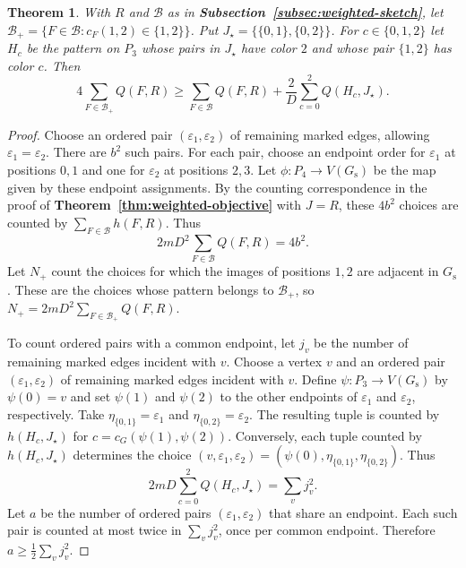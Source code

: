\documentclass[preprint,11pt,numbers]{elsarticle-arxiv}
\numberwithin{equation}{section}
\newtheorem{theorem}{Theorem}[section]
\theoremstyle{definition}
\begin{document}
\begin{theorem}\label{thm:remaining-edge-orderings}
With $R$ and $\mathcal B$ as in
\textbf{Subsection~\ref{subsec:weighted-sketch}}, let
$\mathcal B_+=\{F\in\mathcal B:c_F(1,2)\in\{1,2\}\}$.
Put $J_\star=\{\{0,1\},\{0,2\}\}$. For $c\in\{0,1,2\}$ let
$H_c$ be the pattern on $P_3$ whose pairs in $J_\star$ have
color $2$ and whose pair $\{1,2\}$ has color $c$. Then
\begin{equation}\label{eq:remaining-edge-orderings}
 4\sum_{F\in\mathcal B_+}Q(F,R)
 \geq\sum_{F\in\mathcal B}Q(F,R)
     +\frac{2}{D}\sum_{c=0}^2 Q(H_c,J_\star).
\end{equation}
\end{theorem}

\begin{proof}
Choose an ordered pair $(\varepsilon_1,\varepsilon_2)$ of
remaining marked edges, allowing $\varepsilon_1=\varepsilon_2$.
There are $b^2$ such pairs. For each pair, choose an endpoint
order for $\varepsilon_1$ at positions $0,1$ and one for
$\varepsilon_2$ at positions $2,3$. Let $\phi\colon P_4\to
V(G_{\mathrm s})$ be the map given by these endpoint assignments.
By the counting correspondence
in the proof of \textbf{Theorem~\ref{thm:weighted-objective}}
with $J=R$, these $4b^2$ choices are counted by
$\sum_{F\in\mathcal B}h(F,R)$. Thus
\[
 2mD^2\sum_{F\in\mathcal B}Q(F,R)=4b^2.
\]
Let $N_+$ count the choices for which the images of positions $1,2$
are adjacent in $G_{\mathrm s}$. These are the choices whose pattern
belongs to $\mathcal B_+$, so
$N_+=2mD^2\sum_{F\in\mathcal B_+}Q(F,R)$.

To count ordered pairs with a common endpoint, let $j_v$ be the
number of remaining marked edges incident with $v$. Choose a vertex
$v$ and an ordered pair $(\varepsilon_1,\varepsilon_2)$ of
remaining marked edges incident with $v$. Define
$\psi\colon P_3\to V(G_{\mathrm s})$ by $\psi(0)=v$ and set
$\psi(1)$ and $\psi(2)$ to the other endpoints of $\varepsilon_1$ and
$\varepsilon_2$, respectively. Take $\eta_{\{0,1\}}=\varepsilon_1$
and $\eta_{\{0,2\}}=\varepsilon_2$. The resulting tuple is counted
by $h(H_c,J_\star)$ for $c=c_G(\psi(1),\psi(2))$. Conversely, each
tuple counted by $h(H_c,J_\star)$ determines the choice
$(v,\varepsilon_1,\varepsilon_2)=(\psi(0),\eta_{\{0,1\}},
\eta_{\{0,2\}})$. Thus
\[
 2mD\sum_{c=0}^2 Q(H_c,J_\star)=\sum_v j_v^2.
\]
Let $a$ be the number of ordered pairs $(\varepsilon_1,\varepsilon_2)$
that share an endpoint. Each such pair is counted at most twice
in $\sum_v j_v^2$, once per common endpoint. Therefore
$a\geq\frac{1}{2}\sum_v j_v^2$.


\end{proof}
\end{document}
